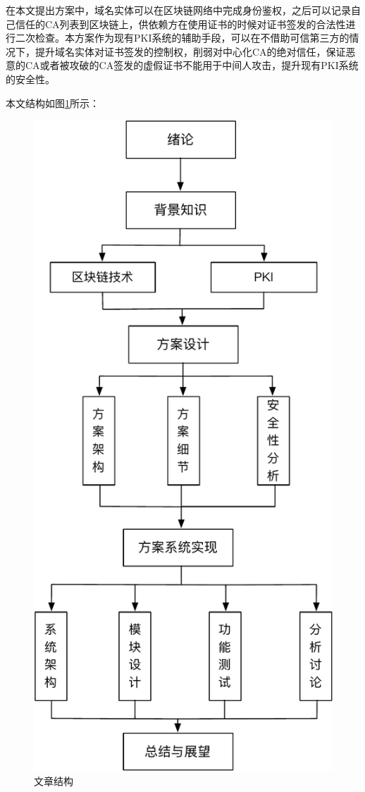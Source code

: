 在本文提出方案中，域名实体可以在区块链网络中完成身份鉴权，之后可以记录自己信任的CA列表到区块链上，供依赖方在使用证书的时候对证书签发的合法性进行二次检查。本方案作为现有PKI系统的辅助手段，可以在不借助可信第三方的情况下，提升域名实体对证书签发的控制权，削弱对中心化CA的绝对信任，保证恶意的CA或者被攻破的CA签发的虚假证书不能用于中间人攻击，提升现有PKI系统的安全性。




本文结构如图\ref{fig:plan}所示：


\begin{figure}[htbp]
 	\centering
 	\includegraphics[scale=0.7]{img/plan}
 	\caption{文章结构}\label{fig:plan}
\end{figure}

